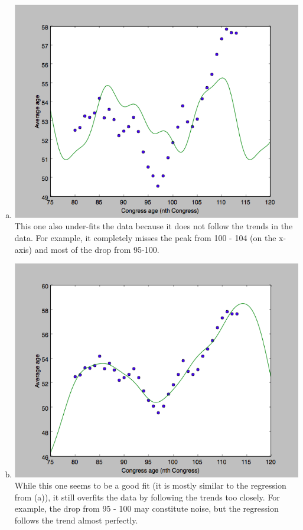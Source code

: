\documentclass[submit]{harvardml}
\begin{document}
\begin{enumerate}[(a)]
	\item \includegraphics[scale = 0.3]{./c}\\	
		This one also under-fits the data because it does not follow the trends in the data. For example, it 
		completely misses the peak from 100 - 104 (on the x-axis) and most of the drop from 95-100.
	\item \includegraphics[scale = 0.3]{./d} \\
		While this one seems to be a good fit (it is mostly similar to the regression from (a)), it still overfits 
		the data by following the trends too closely. For example, the drop from 95 - 100 may constitute 
		noise, but the regression follows the trend almost perfectly. 

\end{enumerate}
\end{document}
